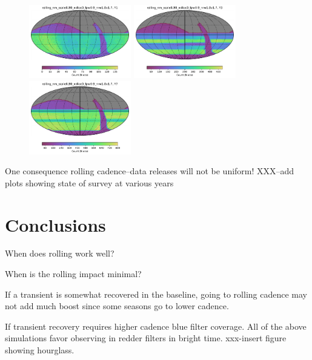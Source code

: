 \documentclass[modern]{aastex62}
\begin{document}
\begin{figure}
\includegraphics[width=1.75in]{plots/yearly_release/rolling_nm_scale0_90_nslice3_fpw0_9_nrw1_0v1_7_Count_night_lt_365_and_note_not_like_DD_HEAL_SkyMap.pdf}
\includegraphics[width=1.75in]{plots/yearly_release/rolling_nm_scale0_90_nslice3_fpw0_9_nrw1_0v1_7_Count_nightlt1095_and_note_not_like_DD_HEAL_SkyMap.pdf}
\includegraphics[width=1.75in]{plots/yearly_release/rolling_nm_scale0_90_nslice3_fpw0_9_nrw1_0v1_7_Count_night_lt_2556_and_note_not_like_DD_HEAL_SkyMap.pdf}

\end{figure}

One consequence rolling cadence--data releases will not be uniform! XXX--add plots showing state of survey at various years

\section{Conclusions}

When does rolling work well? 

When is the rolling impact minimal?

If a transient is somewhat recovered in the baseline, going to rolling cadence may not add much boost since some seasons go to lower cadence.

If transient recovery requires higher cadence blue filter coverage. All of the above simulations favor observing in redder filters in bright time. xxx-insert figure showing hourglass. 
\end{document}
